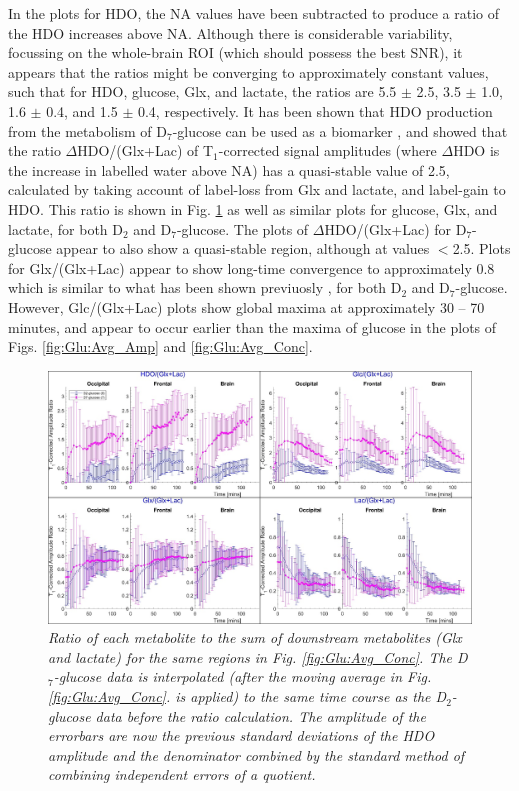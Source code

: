 In the plots for \ac{HDO}, the \ac{NA} values have been subtracted to produce a ratio of the \ac{HDO} increases above \ac{NA}. Although there is considerable variability, focussing on the whole-brain \ac{ROI} (which should possess the best \ac{SNR}), it appears that the ratios might be converging to approximately constant values, such that for \ac{HDO}, glucose, Glx, and lactate, the ratios are 5.5 $\pm$ 2.5, 3.5 $\pm$ 1.0, 1.6 $\pm$ 0.4, and 1.5 $\pm$ 0.4, respectively. It has been shown that \ac{HDO} production from the metabolism of D$_7$-glucose can be used as a biomarker \cite{Mahar2021DeuteratedGlucose}, and showed that the ratio $\Delta$HDO/(Glx+Lac) of T$_1$-corrected signal amplitudes (where $\Delta$HDO is the increase in labelled water above \ac{NA}) has a quasi-stable value of 2.5, calculated by taking account of label-loss from Glx and lactate, and label-gain to \ac{HDO}. This ratio is shown in Fig. \ref{fig:Glu:HDO_Rat} as well as similar plots for glucose, Glx, and lactate, for both D$_2$ and D$_7$-glucose. The plots of $\Delta$HDO/(Glx+Lac) for D$_7$-glucose appear to also show a quasi-stable region, although at values $<$2.5. Plots for Glx/(Glx+Lac) appear to show long-time convergence to approximately 0.8 which is similar to what has been shown previuosly \cite{Kaggie2022DeuteriumMetabolism}, for both D$_2$ and D$_7$-glucose. However, Glc/(Glx+Lac) plots show global maxima at approximately 30 – 70 minutes, and appear to occur earlier than the maxima of glucose in the plots of Figs. \ref{fig:Glu:Avg_Amp} and \ref{fig:Glu:Avg_Conc}.  

\begin{figure}
    \centering
    \includegraphics[width = 1\textwidth]{Figures/Glucose/HDO_Ratio.png}
    \caption{\textit{Ratio of each metabolite to the sum of downstream metabolites (Glx and lactate) for the same regions in Fig. \ref{fig:Glu:Avg_Conc}. The D$_7$-glucose data is interpolated (after the moving average in Fig. \ref{fig:Glu:Avg_Conc}. is applied) to the same time course as the D$_2$-glucose data before the ratio calculation. The amplitude of the errorbars are now the previous standard deviations of the \ac{HDO} amplitude and the denominator combined by the standard method of combining independent errors of a quotient.}}
    \label{fig:Glu:HDO_Rat}
\end{figure}

